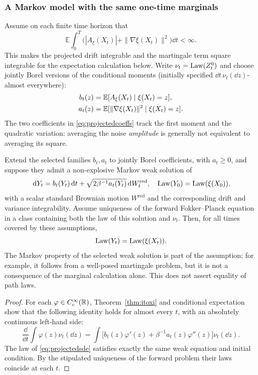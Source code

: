 \documentclass[12pt,a4paper,oneside]{book}
\begin{document}
\subsubsection{A Markov model with the same one-time marginals}
Assume on each finite time horizon that
\begin{equation*}
\mathbb E\int_0^T\bigl(|A_\xi(X_t)|+\|\nabla\xi(X_t)\|^2\bigr)\dd t<\infty.
\end{equation*}
This makes the projected drift integrable and the martingale term
square integrable for the expectation calculation below. Write
$\nu_t=\operatorname{Law}(Z_t^0)$ and choose jointly Borel versions of the conditional
moments (initially specified $\dd t\,\nu_t(\dd z)$-almost everywhere):
\begin{equation}
\begin{aligned}
b_t(z)&=\mathbb{E}[A_\xi(X_t)\mid\xi(X_t)=z],\\
 a_t(z)&=\mathbb{E}[\|\nabla\xi(X_t)\|^2\mid\xi(X_t)=z].
\end{aligned}
\label{eq:projectedcoeffs}
\end{equation}
The two coefficients in \eqref{eq:projectedcoeffs} track the first moment and the quadratic variation: averaging the
noise \emph{amplitude} is generally not equivalent to averaging its square.

\begin{theorem}
\label{thm:mimic}
\label{src:p13q3}
Extend the selected families $b_t,a_t$ to jointly Borel coefficients, with
$a_t\ge0$, and suppose they admit a non-explosive Markov weak solution of
\begin{equation}
 \,\mathrm{d} Y_t=b_t(Y_t)\,\mathrm{d} t+\sqrt{2\beta^{-1}a_t(Y_t)}\,\mathrm{d} W_t^{\mathrm{red}},
 \quad\operatorname{Law}(Y_0)=\operatorname{Law}(\xi(X_0)),
\label{eq:projectedsde}
\end{equation}
with a scalar standard Brownian motion $W^{\mathrm{red}}$ and the corresponding
drift and variance integrability. Assume uniqueness
of the forward Fokker--Planck equation in a class containing both the
law of this solution and $\nu_t$. Then, for all times covered by these
assumptions,
\begin{equation*}
\operatorname{Law}(Y_t)=\operatorname{Law}(\xi(X_t)).
\end{equation*}
The Markov property of the selected weak solution is part of the
assumption; for example, it follows from a well-posed martingale problem,
but it is not a consequence of the marginal calculation alone.
This does not assert equality of path laws.
\end{theorem}
\begin{proof}
For each $\varphi\in C_c^\infty(\mathbb{R})$, Theorem~\ref{thm:itoxi}
and conditional expectation show that the following identity holds for
almost every $t$, with an absolutely continuous left-hand side:
\begin{equation*}
\frac{\dd}{\dd t}\int\varphi(z)\nu_t(\dd z)
 =\int\big[b_t(z)\varphi'(z)+\beta^{-1}a_t(z)\varphi''(z)\big]\nu_t(\dd z).
\end{equation*}
The law of \eqref{eq:projectedsde} satisfies exactly the same weak equation
and initial condition. By the stipulated uniqueness of the forward
problem their laws coincide at each $t$.
\end{proof}
\end{document}
